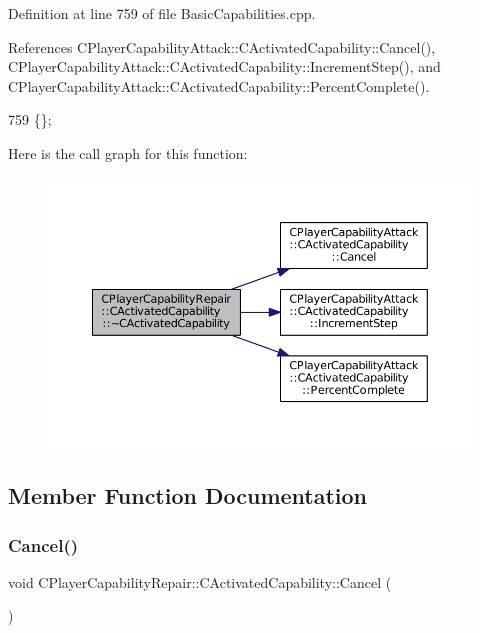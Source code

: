 Definition at line 759 of file Basic\+Capabilities.\+cpp.



References C\+Player\+Capability\+Attack\+::\+C\+Activated\+Capability\+::\+Cancel(), C\+Player\+Capability\+Attack\+::\+C\+Activated\+Capability\+::\+Increment\+Step(), and C\+Player\+Capability\+Attack\+::\+C\+Activated\+Capability\+::\+Percent\+Complete().


\begin{DoxyCode}
759 \{\};
\end{DoxyCode}
Here is the call graph for this function\+:\nopagebreak
\begin{figure}[H]
\begin{center}
\leavevmode
\includegraphics[width=350pt]{classCPlayerCapabilityRepair_1_1CActivatedCapability_ae4c632553e0898f8501a3f6bcd71cfaa_cgraph}
\end{center}
\end{figure}


\subsection{Member Function Documentation}
\hypertarget{classCPlayerCapabilityRepair_1_1CActivatedCapability_a719cee3446291470987f504739f63215}{}\label{classCPlayerCapabilityRepair_1_1CActivatedCapability_a719cee3446291470987f504739f63215} 
\subsubsection{\texorpdfstring{Cancel()}{Cancel()}}
{\footnotesize\ttfamily void C\+Player\+Capability\+Repair\+::\+C\+Activated\+Capability\+::\+Cancel (\begin{DoxyParamCaption}{ }\end{DoxyParamCaption})\hspace{0.3cm}{\ttfamily [virtual]}}



